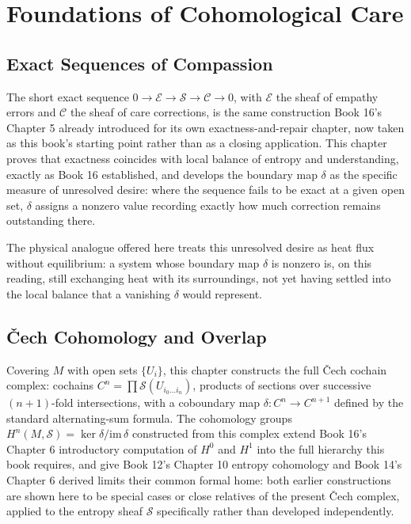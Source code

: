 \part{Foundations of Cohomological Care}

\chapter{Exact Sequences of Compassion}

The short exact sequence $0 \to \mathcal{E} \to \mathcal{S} \to \mathcal{C} \to 0$, with $\mathcal{E}$ the sheaf of empathy errors and $\mathcal{C}$ the sheaf of care corrections, is the same construction Book 16's Chapter 5 already introduced for its own exactness-and-repair chapter, now taken as this book's starting point rather than as a closing application. This chapter proves that exactness coincides with local balance of entropy and understanding, exactly as Book 16 established, and develops the boundary map $\delta$ as the specific measure of unresolved desire: where the sequence fails to be exact at a given open set, $\delta$ assigns a nonzero value recording exactly how much correction remains outstanding there.

The physical analogue offered here treats this unresolved desire as heat flux without equilibrium: a system whose boundary map $\delta$ is nonzero is, on this reading, still exchanging heat with its surroundings, not yet having settled into the local balance that a vanishing $\delta$ would represent.

\chapter{Čech Cohomology and Overlap}

Covering $M$ with open sets $\{U_i\}$, this chapter constructs the full Čech cochain complex: cochains $C^n = \prod \mathcal{S}(U_{i_0 \ldots i_n})$, products of sections over successive $(n+1)$-fold intersections, with a coboundary map $\delta: C^n \to C^{n+1}$ defined by the standard alternating-sum formula. The cohomology groups $H^n(M, \mathcal{S}) = \ker \delta / \mathrm{im}\, \delta$ constructed from this complex extend Book 16's Chapter 6 introductory computation of $H^0$ and $H^1$ into the full hierarchy this book requires, and give Book 12's Chapter 10 entropy cohomology and Book 14's Chapter 6 derived limits their common formal home: both earlier constructions are shown here to be special cases or close relatives of the present Čech complex, applied to the entropy sheaf $\mathcal{S}$ specifically rather than developed independently.

